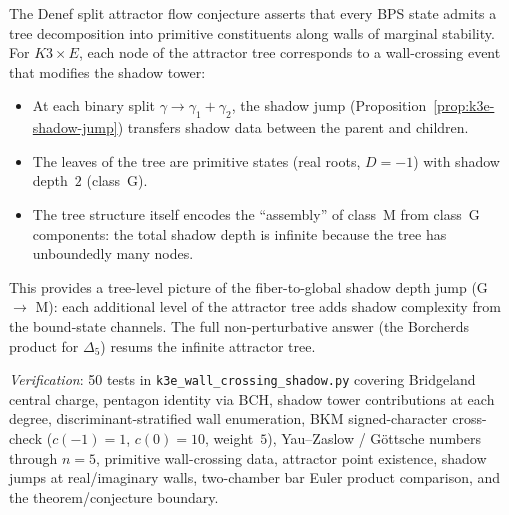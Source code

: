 \begin{remark}
\label{rem:k3e-attractor-shadow}
The Denef split attractor flow conjecture asserts that every BPS state admits a tree decomposition into primitive constituents along walls of marginal stability. For $K3 \times E$, each node of the attractor tree corresponds to a wall-crossing event that modifies the shadow tower:
\begin{itemize}
 \item At each binary split $\gamma \to \gamma_1 + \gamma_2$, the shadow jump (Proposition~\ref{prop:k3e-shadow-jump}) transfers shadow data between the parent and children.
 \item The leaves of the tree are primitive states (real roots, $D = -1$) with shadow depth~$2$ (class~G).
 \item The tree structure itself encodes the ``assembly'' of class~M from class~G components: the total shadow depth is infinite because the tree has unboundedly many nodes.
\end{itemize}
This provides a tree-level picture of the fiber-to-global shadow depth jump (G $\to$ M): each additional level of the attractor tree adds shadow complexity from the bound-state channels. The full non-perturbative answer (the Borcherds product for $\Delta_5$) resums the infinite attractor tree.
\end{remark}

\noindent\textit{Verification}: 50 tests in \texttt{k3e\_wall\_crossing\_shadow.py} covering Bridgeland central charge, pentagon identity via BCH, shadow tower contributions at each degree, discriminant-stratified wall enumeration, BKM signed-character cross-check ($c(-1) = 1$, $c(0) = 10$, weight~$5$), Yau--Zaslow / G\"ottsche numbers through $n = 5$, primitive wall-crossing data, attractor point existence, shadow jumps at real/imaginary walls, two-chamber bar Euler product comparison, and the theorem/conjecture boundary.


